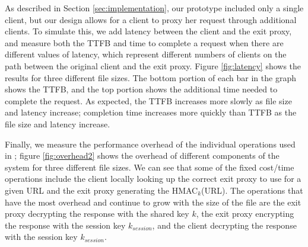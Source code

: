 

As described in Section \ref{sec:implementation}, our prototype included only a single client, but 
our design allows for a client to proxy her request through additional clients.  To simulate this, we 
add latency between the client and the exit proxy, and measure both the TTFB and time to complete a request 
when there are different values of latency, which represent different numbers of clients on the path between the 
original client and the exit proxy.  Figure \ref{fig:latency} shows the results for three different file sizes. The 
bottom portion of each bar in the graph shows the TTFB, and the top portion shows the additional time needed 
to complete the request.  As expected, the TTFB increases more slowly as file size
and latency increase; completion time
increases more quickly than TTFB as the file size and latency increase.   


Finally, we measure the performance overhead of the individual operations used in
\system{}; figure \ref{fig:overhead2} shows
the overhead of different components of the system for three different file sizes.  We can see that some of the fixed cost/time 
operations include the client locally looking up the correct exit proxy to use for a given URL and the exit proxy generating the 
HMAC$_{k}$(URL).  The operations that have the most overhead and continue to grow with the size of the file are the exit proxy decrypting 
the response with the shared key $k$, the exit proxy encrypting the response with the session key $k_{session}$, and the client 
decrypting the response with the session key $k_{session}$.

